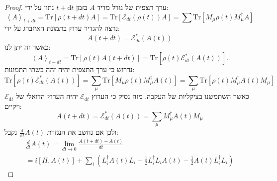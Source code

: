 \documentclass{tstextbook}
\begin{document}
\begin{proof}
ערך תצפית של גודל מדיד \(A\) בזמן \(t+\mathrm{d}t\) נתון על ידי:
$$\left\langle A\right\rangle_{t+d t}=\mathrm{Tr}\left[\rho\left(t+d t\right)A\right]=\mathrm{Tr}\left[\mathcal{E}_{d t}\left(\rho\left(t\right)\right)A\right]=\sum\mathrm{Tr}\left[M_{\mu}\rho\left(t\right)M_{\mu}^{\dagger}A\right]$$
נרצה להגדיר ערוץ בתמונת האיזברג על ידי:
$$A\left(t+d t\right)=\mathcal{E}_{d t}^{*}\left(A\left(t\right)\right)$$
כאשר זה יתן לנו:
$$\left\langle A\right\rangle_{t+d t}=\mathrm{Tr}\left[\rho\left(t\right)A\left(t+d t\right)\right]=\mathrm{Tr}\left[\rho\left(t\right)\mathcal{E}_{d t}^{\ast}\left(A\left(t\right)\right)\right].$$
נדרוש כי ערך התצפית יהיה זהה בשתי התמונות:
$$\mathrm{Tr}\left[\rho\left(t\right)\mathcal{E}_{d t}^{\ast}\left(A\left(t\right)\right)\right]=\sum_{\mu}\mathrm{Tr}\left[M_{\mu}\rho\left(t\right)M_{\mu}^{\dagger}A\left(t\right)\right]=\sum_{\mu}\mathrm{Tr}\left[\rho\left(t\right)M_{\mu}^{\dagger}A\left(t\right)M_{\mu}\right]$$
כאשר השתמשנו בציקליות של העקבה. מזה נסיק כי הערוץ \(\mathcal{E}_{\mathrm{d}t}\) יהיה הערוץ הדואלי של \(\mathcal{E}_{\mathrm{d}t}\) ויקיים:
$$A\left(t+d t\right)=\mathcal{E}_{d t}^{*}\left(A\left(t\right)\right)=\sum_{\mu}M_{\mu}^{\dagger}A\left(t\right)M_{\mu}$$
ולכן אם נחשב את הנגזרת \(\frac{\mathrm{d} }{\mathrm{d} t}A(t)\) נקבל:
$$\begin{gather}{{\frac{d}{d t}A\left(t\right)=\operatorname*{lim}_{d t\longrightarrow0}\frac{A\left(t+d t\right)-A\left(t\right)}{d t}}}\\ {{=i\left[H,A\left(t\right)\right]+\sum_{i}\left(L_{i}^{\dagger}A\left(t\right)L_{i}-\frac{1}{2}L_{i}^{\dagger}L_{i}A\left(t\right)-\frac{1}{2}A\left(t\right)L_{i}^{\dagger}L_{i}\right)}}\end{gather}$$

\end{proof}
\end{document}
